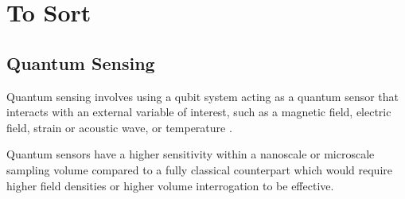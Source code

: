 \chapter{To Sort}





















\section{Quantum Sensing}
Quantum sensing involves using a qubit system acting as a quantum sensor that interacts with an external variable of
interest, such as a magnetic field, electric field, strain or acoustic wave, or temperature \cite{Castelletto_2024}. 

Quantum sensors have a higher sensitivity within a nanoscale or microscale sampling volume compared to a fully classical counterpart which would require higher field densities or higher volume interrogation to be effective. 

\cite{Wolfowicz2021}

\cite{Kin2021}


\cite{Cochrane2016}


\cite{Xie2021}

